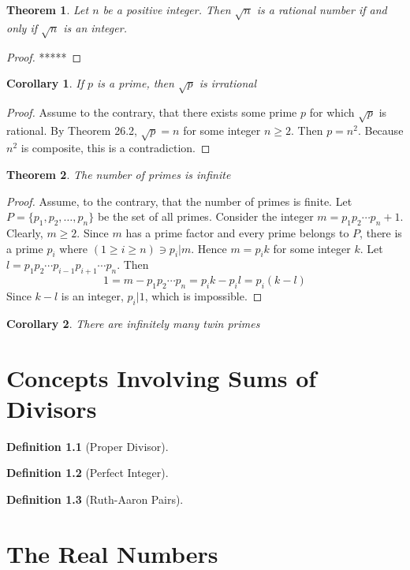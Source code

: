 \documentclass[10pt]{report}
\newtheorem{thm1}{Theorem}[chapter]
\newtheorem{cor1}{Corollary}[chapter]
\newtheorem{def1}{Definition}[chapter]
\begin{document}
\begin{thm1}
Let $n$ be a positive integer. Then $\sqrt{n}$ is a rational number if and only if $\sqrt{n}$ is an integer.
\end{thm1}
\begin{proof}
*****
\end{proof}
\begin{cor1}
If $p$ is a prime, then $\sqrt{p}$ is irrational
\end{cor1}
\begin{proof}
Assume to the contrary, that there exists some prime $p$ for which $\sqrt{p}$ is rational. By Theorem 26.2, $\sqrt{p}=n$ for some integer $n\geq 2$. Then $p=n^2$. Because $n^2$ is composite, this is a contradiction.
\end{proof}
\begin{thm1}
The number of primes is infinite
\end{thm1}
\begin{proof}
Assume, to the contrary, that the number of primes is finite. Let $P=\{p_1,p_2,\dots ,p_n\}$ be the set of all primes. Consider the integer $m=p_1p_2\cdots p_n+1$. Clearly, $m\geq 2$. Since $m$ has a prime factor and every prime belongs to $P$, there is a prime $p_i$ where $(1\geq i\geq n)\ni p_i|m$. Hence $m=p_ik$ for some integer $k$. Let $l=p_1p_2\cdots p_{i-1}p_{i+1}\cdots p_n$. Then
$$1=m- p_1p_2\cdots p_n=p_ik-p_il = p_i(k-l)$$
Since $k-l$ is an integer, $p_i|1$, which is impossible.
\end{proof}
\begin{cor1}
There are infinitely many twin primes
\end{cor1}
\chapter{Concepts Involving Sums of Divisors}
\begin{def1}[Proper Divisor]
\end{def1}
\begin{def1}[Perfect Integer]
\end{def1}
\begin{def1}[Ruth-Aaron Pairs]
\end{def1}


\chapter{The Real Numbers}
\end{document}
